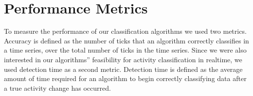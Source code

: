\section{Performance Metrics}
To measure the performance of our classification algorithms we used
two metrics. Accuracy is defined as the number of ticks that an algorithm
correctly classifies in a time series, over the total number of ticks
in the time series. Since we were also interested in our algorithms''
feasibility for activity classification in realtime, we used detection time as
a second metric. Detection time is defined as the average amount of time
required for an algorithm to begin correctly classifying data after a
true activity change has occurred.




%
